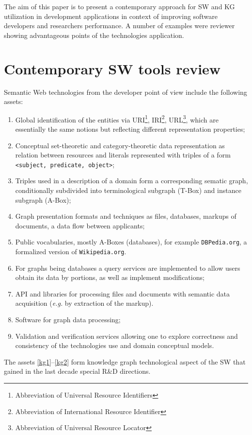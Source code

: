 \documentclass[
]{ceurart}
\begin{document}
The aim of this paper is to present a contemporary approach for SW and KG utilization in development applications in context of improving software developers and researchers performance.  A number of examples were reviewer showing advantageous points of the technologies application.


\section{Contemporary SW tools review}
\label{sec:sw-tools}

Semantic Web technologies from the developer point of view include the following assets:
\begin{enumerate}
\item Global identification of the entities via URI\footnote{Abbreviation of Universal Resource Identifiers}, IRI\footnote{Abbreviation of International Resource Identifier}, URL\footnote{Abbreviation of Universal Resource Locator}, which are essentially the same notions but reflecting different representation properties;
\item Conceptual set-theoretic and category-theoretic data representation as relation between resources and literals represented with triples of a form \texttt{<subject, predicate, object>};
\item Triples used in a description of a domain form a corresponding sematic graph, conditionally subdivided into terminological subgraph (T-Box) and instance subgraph (A-Box);
\item Graph presentation formats and techniques as files, databases, markups of documents, a data flow between applicants; \label{kg1}
\item Public vocabularies, mostly A-Boxes (databases), for example \texttt{DBPedia.org}, a formalized version of \texttt{Wikipedia.org}. %
\item For graphs being databases a query services are implemented to allow users obtain its data by portions, as well as implement modifications;
\item API and libraries for processing files and documents with semantic data acquisition (\emph{e.g.} by extraction of the markup).
\item Software for graph data processing;
\item Validation and verification services allowing one to explore correctness and consistency of the technologies use and domain conceptual models. \label{kg2}
\end{enumerate}
The assets \ref{kg1}--\ref{kg2} form knowledge graph technological aspect of the SW that gained in the last decade special R\&D directions.
\end{document}
